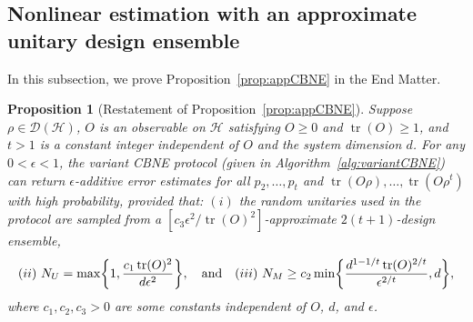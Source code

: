 \documentclass[aps,prl,twocolumn,nofootinbib,superscriptaddress,10pt]{revtex4-2}
\let\originalleft\left
\let\originalright\right
\renewcommand{\left}{\mathopen{}\mathclose\bgroup\originalleft}
\renewcommand{\right}{\aftergroup\egroup\originalright}
\DeclareMathOperator{\Tr}{tr}
\theoremstyle{plain}
\newtheorem{prop}{Proposition}
\theoremstyle{definition}
\newcommand{\caH}{\mathcal{H}}
\newcommand{\caD}{\mathcal{D}}
\newcommand{\pref}[1]{Proposition~\ref{#1}}
\begin{document}
\subsection{Nonlinear estimation with an approximate unitary design ensemble}\label{sec:appdesignCBNE}

In this subsection, we prove \pref{prop:appCBNE} in the End Matter.  

\begin{prop}[Restatement of \pref{prop:appCBNE}]
\label{prop:MomOResultApp}%
Suppose $\rho\in\caD(\caH)$, $O$ is an observable on $\caH$ satisfying $O\geq 0$ and $\Tr(O)\geq1$, and $t>1$ is a constant integer independent of $O$ and the system dimension $d$.
For any $0<\epsilon<1$, the variant CBNE protocol (given in  Algorithm~\ref{alg:variantCBNE}) can return $\epsilon$-additive error estimates for all $p_2,\dots,p_t$  and $\Tr(O\rho),\dots,\Tr(O\rho^t)$ with high probability, provided that: $(i)$ the random unitaries used in the protocol are sampled from a $[c_3\epsilon^2\!/\!\Tr(O)^2]$-approximate $2(t+1)$-design ensemble, 
\begin{align} \label{eq:MomOResultApp}
{(ii)} \ N_U = \max\left\lbrace 1, \dfrac{c_1 \Tr(O)^2}{d\epsilon^2} \right\rbrace, 
\quad \text{and} \quad
{(iii)} \ N_M \geq  c_2  \min\!\bigg\lbrace \frac{d^{1-1/t}\Tr(O)^{2/t}}{\epsilon^{2/t}}, d \bigg\rbrace,  
\end{align}
where $c_1,c_2,c_3>0$ are some constants  independent of $O$, $d$, and $\epsilon$. 
\end{prop}
\end{document}

